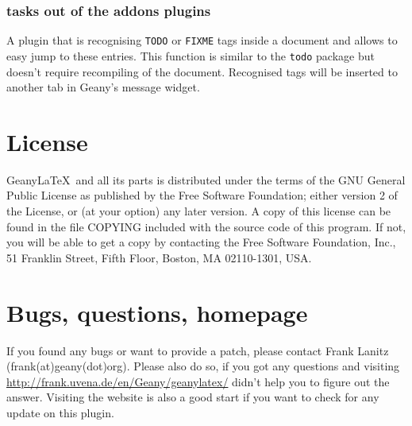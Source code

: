 \documentclass[%
a4paper,%
10pt,%
oneside,%
DIV18,
headsepline,
plainheadsepline,
footsepline,
plainfootsepline,
bibtotoc,%
liststotoc,%
BCOR12mm,%
halfparskip,%
openany,%
]{scrartcl}
\begin{document}
\subsubsection{tasks out of the addons plugins}
A plugin that is recognising \texttt{TODO} or \texttt{FIXME} tags
inside a document and allows to easy jump to these entries. This
function is similar to the \texttt{todo} package but doesn't require
recompiling of the document. Recognised tags will be inserted to
another tab in Geany's message widget.\\

\section{License}
Geany\LaTeX\ and all its parts is distributed under the terms of the
GNU General Public License as published by the Free Software
Foundation; either version 2 of the License, or (at your option) any
later version. A copy of this license can be found in the file COPYING
included with the source code of this program. If not, you will be
able to get a copy by contacting the Free Software Foundation, Inc.,
51 Franklin Street, Fifth Floor, Boston, MA 02110-1301, USA.


\section{Bugs, questions, homepage}
\label{contact}
If you found any bugs or want to provide a patch, please contact Frank
Lanitz (frank(at)geany(dot)org). Please also do so, if you got any
questions and visiting \url{http://frank.uvena.de/en/Geany/geanylatex/}
didn't help you to figure out the answer. Visiting the website is also
a good start if you want to check for any update on this plugin.
\end{document}
